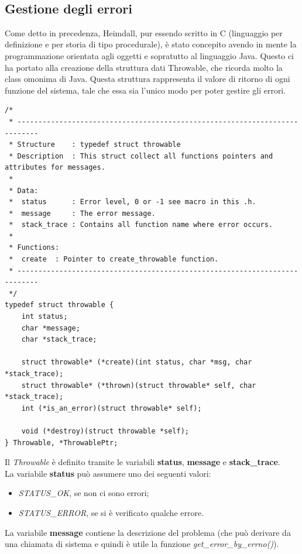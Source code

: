 \documentclass[italian]{tktltiki2}
\begin{document}
\begin{lstlisting}
	
\end{lstlisting}

\subsection{Gestione degli errori}
\label{sec:errors}
Come detto in precedenza, Heimdall, pur essendo scritto in C (linguaggio per definizione e per storia di tipo procedurale), è stato concepito avendo in mente la programmazione orientata agli oggetti e sopratutto al linguaggio Java. Questo ci ha portato alla creazione della struttura dati Throwable, che ricorda molto la class omonima di Java\cite{throwable_java}.
Questa struttura rappresenta il valore di ritorno di ogni funzione del sistema, tale che essa sia l'unico modo per poter gestire gli errori.
\begin{lstlisting}
/*
 * ---------------------------------------------------------------------------
 * Structure    : typedef struct throwable
 * Description  : This struct collect all functions pointers and attributes for messages.
 *
 * Data:
 *  status      : Error level, 0 or -1 see macro in this .h.
 *  message     : The error message.
 *  stack_trace : Contains all function name where error occurs.
 *
 * Functions:
 *  create  : Pointer to create_throwable function.
 * ---------------------------------------------------------------------------
 */
typedef struct throwable {
    int status;
    char *message;
    char *stack_trace;

    struct throwable* (*create)(int status, char *msg, char *stack_trace);
    struct throwable* (*thrown)(struct throwable* self, char *stack_trace);
    int (*is_an_error)(struct throwable* self);
    
    void (*destroy)(struct throwable *self);
} Throwable, *ThrowablePtr;
\end{lstlisting} 
Il \emph{Throwable} è definito tramite le variabili \textbf{status}, \textbf{message} e \textbf{stack\_trace}. \\
La variabile \textbf{status} può assumere uno dei seguenti valori:
\begin{itemize}
  \item \emph{STATUS\_OK}, se non ci sono errori;
  \item \emph{STATUS\_ERROR}, se si è verificato qualche errore.
\end{itemize}
La variabile \textbf{message} contiene la descrizione del problema (che può derivare da una chiamata di sistema e quindi è utile la funzione \emph{get\_error\_by\_errno()}).
\end{document}
